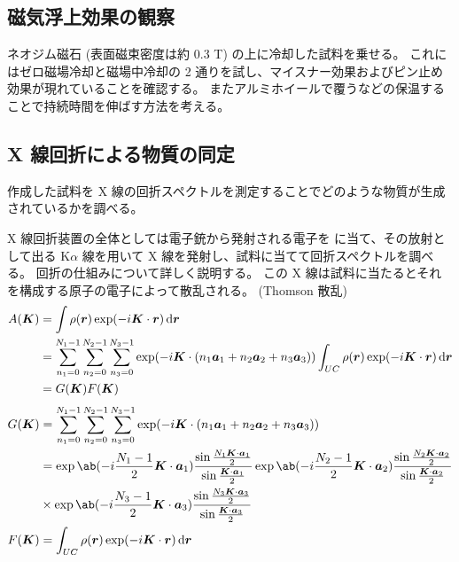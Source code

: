 \documentclass[uplatex,dvipdfmx,a4paper,11pt]{jlreq}
\newcommand{\rr}{\bm{r}}
\numberwithin{equation}{section}
\theoremstyle{definition}
\begin{document}
\subsection{磁気浮上効果の観察}
ネオジム磁石 (表面磁束密度は約 0.3 \si{T}) の上に冷却した試料を乗せる。
これにはゼロ磁場冷却と磁場中冷却の 2 通りを試し、マイスナー効果およびピン止め効果が現れていることを確認する。
またアルミホイールで覆うなどの保温することで持続時間を伸ばす方法を考える。


\subsection{X 線回折による物質の同定}
作成した試料を X 線の回折スペクトルを測定することでどのような物質が生成されているかを調べる。

X 線回折装置の全体としては電子銃から発射される電子を  に当て、その放射として出る K$\alpha$ 線を用いて X 線を発射し、試料に当てて回折スペクトルを調べる。
回折の仕組みについて詳しく説明する。
この X 線は試料に当たるとそれを構成する原子の電子によって散乱される。 (Thomson 散乱)
\begin{align}
  A(\bm{K}) & = \int \rho(\rr)\exp(-i\bm{K}\cdot\rr)\dl{\rr}                                                                                                                                         \\
            & = \sum_{n_1 = 0}^{N_1 - 1}\sum_{n_2 = 0}^{N_2 - 1}\sum_{n_3 = 0}^{N_3 - 1}\exp(-i\bm{K}\cdot(n_1\bm{a}_1 + n_2\bm{a}_2 + n_3\bm{a}_3))\int_{UC}\rho(\rr)\exp(-i\bm{K}\cdot\rr)\dl{\rr} \\
            & = G(\bm{K}) F(\bm{K})
\end{align}
\begin{align}
  G(\bm{K}) & = \sum_{n_1 = 0}^{N_1 - 1}\sum_{n_2 = 0}^{N_2 - 1}\sum_{n_3 = 0}^{N_3 - 1}\exp(-i\bm{K}\cdot(n_1\bm{a}_1 + n_2\bm{a}_2 + n_3\bm{a}_3))                                                                                                                       \\
            & = \exp\ab(-i\frac{N_1 - 1}{2}\bm{K}\cdot\bm{a}_1)\frac{\sin\frac{N_1\bm{K}\cdot\bm{a}_1}{2}}{\sin\frac{\bm{K}\cdot\bm{a}_1}{2}}\exp\ab(-i\frac{N_2 - 1}{2}\bm{K}\cdot\bm{a}_2)\frac{\sin\frac{N_2\bm{K}\cdot\bm{a}_2}{2}}{\sin\frac{\bm{K}\cdot\bm{a}_2}{2}} \\
            & \times \exp\ab(-i\frac{N_3 - 1}{2}\bm{K}\cdot\bm{a}_3)\frac{\sin\frac{N_3\bm{K}\cdot\bm{a}_3}{2}}{\sin\frac{\bm{K}\cdot\bm{a}_3}{2}}                                                                                                                         \\
  F(\bm{K}) & = \int_{UC}\rho(\rr)\exp(-i\bm{K}\cdot\rr)\dl{\rr}
\end{align}
\end{document}
